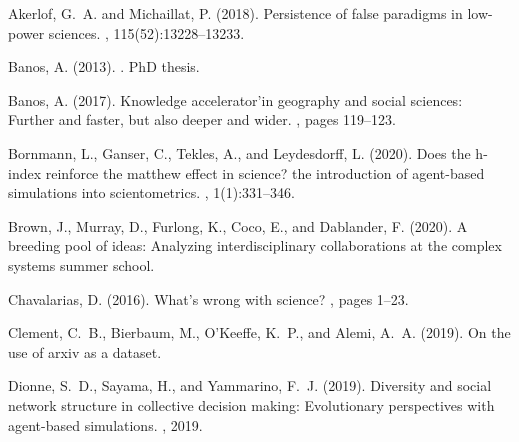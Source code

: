 \documentclass[utf8,11pt]{article}
\begin{document}
%
%
\begin{thebibliography}{}

Akerlof, G.~A. and Michaillat, P. (2018).
\newblock Persistence of false paradigms in low-power sciences.
,
  115(52):13228--13233.

Banos, A. (2013).
.
\newblock PhD thesis.

Banos, A. (2017).
\newblock Knowledge accelerator’in geography and social sciences: Further and
  faster, but also deeper and wider.
, pages 119--123.

Bornmann, L., Ganser, C., Tekles, A., and Leydesdorff, L. (2020).
\newblock Does the h-index reinforce the matthew effect in science? the
  introduction of agent-based simulations into scientometrics.
, 1(1):331--346.

Brown, J., Murray, D., Furlong, K., Coco, E., and Dablander, F. (2020).
\newblock A breeding pool of ideas: Analyzing interdisciplinary collaborations
  at the complex systems summer school.

Chavalarias, D. (2016).
\newblock What's wrong with science?
, pages 1--23.

Clement, C.~B., Bierbaum, M., O'Keeffe, K.~P., and Alemi, A.~A. (2019).
\newblock On the use of arxiv as a dataset.

Dionne, S.~D., Sayama, H., and Yammarino, F.~J. (2019).
\newblock Diversity and social network structure in collective decision making:
  Evolutionary perspectives with agent-based simulations.
, 2019.


\end{thebibliography}
\end{document}
